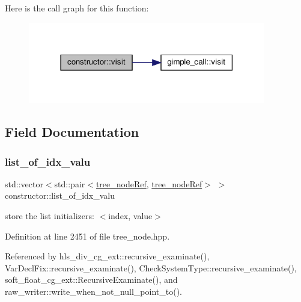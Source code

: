 Here is the call graph for this function\+:
\nopagebreak
\begin{figure}[H]
\begin{center}
\leavevmode
\includegraphics[width=294pt]{d4/de6/structconstructor_ab925f188b5f5eb45088c8c72ea11055e_cgraph}
\end{center}
\end{figure}


\subsection{Field Documentation}
\mbox{\label{structconstructor_a0da8ab8a69e59238810e8aa8d2e8caff}} 
\subsubsection{\texorpdfstring{list\+\_\+of\+\_\+idx\+\_\+valu}{list\_of\_idx\_valu}}
{\footnotesize\ttfamily std\+::vector$<$std\+::pair$<$\hyperlink{tree__node_8hpp_a6ee377554d1c4871ad66a337eaa67fd5}{tree\+\_\+node\+Ref}, \hyperlink{tree__node_8hpp_a6ee377554d1c4871ad66a337eaa67fd5}{tree\+\_\+node\+Ref}$>$ $>$ constructor\+::list\+\_\+of\+\_\+idx\+\_\+valu}



store the list initializers\+: $<$index, value$>$ 



Definition at line 2451 of file tree\+\_\+node.\+hpp.



Referenced by hls\+\_\+div\+\_\+cg\+\_\+ext\+::recursive\+\_\+examinate(), Var\+Decl\+Fix\+::recursive\+\_\+examinate(), Check\+System\+Type\+::recursive\+\_\+examinate(), soft\+\_\+float\+\_\+cg\+\_\+ext\+::\+Recursive\+Examinate(), and raw\+\_\+writer\+::write\+\_\+when\+\_\+not\+\_\+null\+\_\+point\+\_\+to().

\mbox{\label{structconstructor_aa8d1c099eb1ac75e7a2bff4e081efb41}} 
